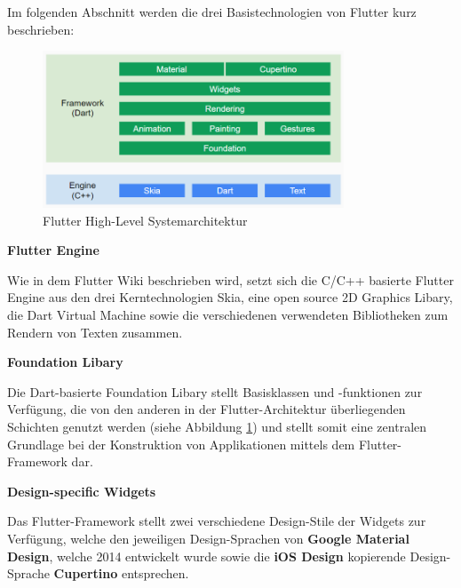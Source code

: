 \documentclass[bibliography=totoc,listof=totoc,BCOR=5mm,DIV=12,oneside]{scrbook}
\begin{document}
\par \medskip Im folgenden Abschnitt werden die drei Basistechnologien von Flutter kurz beschrieben:

\begin{figure}[H]
	\centering
	\includegraphics[width=0.8\textwidth, keepaspectratio]{Bilder/highLevelOverview.png}
	\caption{Flutter High-Level Systemarchitektur \cite{Flu5}}
	\label{img:flutterHighLevelSystemOverview}
\end{figure}

\newpage
\par \bigskip \textbf{Flutter Engine}
\par Wie in dem Flutter Wiki \citep{Flu4} beschrieben wird, setzt sich die C/C++ basierte Flutter Engine aus den drei Kerntechnologien Skia\citep{Skia1}, eine open source 2D Graphics Libary, die Dart Virtual Machine sowie die verschiedenen verwendeten Bibliotheken zum Rendern von Texten zusammen.

\par \bigskip \textbf{Foundation Libary}
\par Die Dart-basierte Foundation Libary\citep{FoundationLibary} stellt Basisklassen und -funktionen zur Verfügung, die von den anderen in der Flutter-Architektur überliegenden Schichten genutzt werden (siehe Abbildung \ref{img:flutterHighLevelSystemOverview}) und stellt somit eine zentralen Grundlage bei der Konstruktion von Applikationen mittels dem Flutter-Framework dar.

\par \bigskip \textbf{Design-specific Widgets}
\par Das Flutter-Framework stellt zwei verschiedene Design-Stile der Widgets zur Verfügung, welche den jeweiligen Design-Sprachen von \textbf{Google Material Design}\citep{Mat1}, welche 2014 entwickelt wurde sowie die \textbf{iOS Design}\citep{iOSDesign} kopierende Design-Sprache \textbf{Cupertino}\citep{Cup1} entsprechen.
\end{document}
